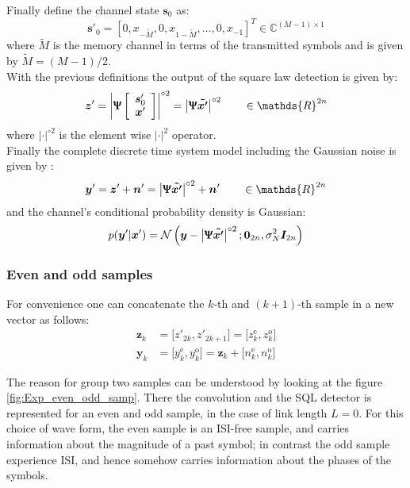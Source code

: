 Finally define the channel state $\bm s_0$ as:
\begin{equation}
\bm{s}'_0=[0,x_{-\widetilde{M}},0,x_{1-\widetilde{M}},\dotsc,0,x_{-1}]^T \in \mathds{C}^{(M-1)\times1}
\end{equation}
where $\widetilde{M}$ is the memory channel in terms of the transmitted symbols and is given by $\widetilde{M}=(M-1)/2$.\\


With the previous definitions the output of the square law detection is given by:
\begin{align*}
	\bm z' = \left|\bm \Uppsi \left[
\begin{array}{c}
\bm{s}'_0  \\
   \bm x'
\end{array}
\right]
\right|^{\circ2} = \left|\bm{ \Uppsi \tilde{x'}}\right|^{\circ2} \qquad \in\mathds{R}^{2n}
\end{align*}
where $|\cdot|^{\circ2}$ is the element wise $|\cdot|^2$ operator.\\

Finally  the complete discrete time system model including the Gaussian noise is given by \cite{Plabst_DD}:
\begin{align*}
	\bm y' = \bm z' + \bm n' = \left|\bm{ \Uppsi \tilde{x'}}\right|^{\circ2} +\bm n' \qquad \in \mathds{R}^{2n}
\end{align*}
and the channel’s conditional probability density is Gaussian\cite{Plabst_DD}:
\begin{equation}
p(\bm y'|\bm x')=\mathcal N \left( \bm y- \left|\bm{ \Uppsi \tilde{x'}}\right|^{\circ2}; \bm 0_{2n} , \sigma_N^2 \bm I_{2n}  \right)
\end{equation}

\subsubsection{Even and odd samples}

For convenience one can concatenate the $k$-th and $(k+1)$-th sample in a new vector as follows:
\begin{align}
\bm z_k&= \bigl[z'_{2k},z'_{2k+1}\bigr]=\bigl[z_{k}^{\text{e}},z_{k}^{\text{o}}\bigr]
\label{eq:z_even_odd}\\
\bm y_k&=\bigl[y_{k}^{\text{e}},y_{k}^{\text{o}}\bigr]=\bm z_k+\bigl[n_{k}^{\text{e}}, n_{k}^{\text{o}}\bigr]
\label{eq:y_even_odd}
\end{align}

The reason for group two samples can be understood by looking at the figure \ref{fig:Exp_even_odd_samp}. There the convolution and the SQL detector is represented for an even and odd sample, in the case of link length $L=0$. For this choice of wave form, the even sample is an ISI-free sample, and carries information about the magnitude of a past symbol; in contrast the odd sample experience ISI, and hence somehow carries information about the phases of the symbols.  


